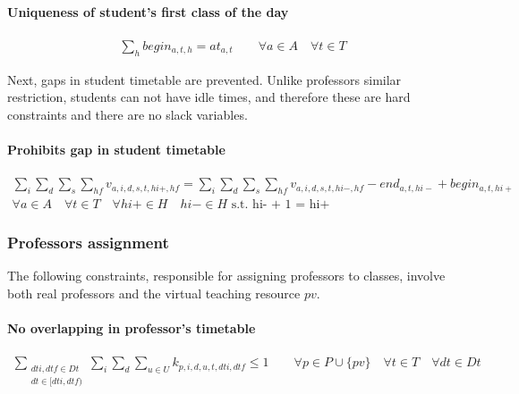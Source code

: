 \paragraph{Uniqueness of student's first class of the day}
\begin{eqnarray}
\sum\limits_{h} begin_{a,t,h} = at_{a,t} \nonumber \qquad
\forall a \in A \quad
\forall t \in T
\end{eqnarray}


Next, gaps in student timetable are prevented. Unlike professors similar restriction, students can not have idle times, and therefore these are hard constraints and there are no slack variables.

\paragraph{Prohibits gap in student timetable}
\begin{eqnarray}
\sum\limits_{i} \sum\limits_{d} \sum\limits_{s} \sum\limits_{hf} v_{a,i,d,s,t,hi+,hf} = 
\sum\limits_{i} \sum\limits_{d} \sum\limits_{s} \sum\limits_{hf} v_{a,i,d,s,t,hi-,hf} - end_{a,t,hi-} + begin_{a,t,hi+} \nonumber \qquad
\\
\forall a \in A \quad
\forall t \in T \quad
\forall hi+ \in H \quad hi- \in H \mbox{ s.t. hi- + 1 = hi+} \nonumber
\end{eqnarray}


\subsubsection{Professors assignment}

The following constraints, responsible for assigning professors to classes, involve both real professors and the virtual teaching resource $pv$.

\paragraph{No overlapping in professor's timetable}
\begin{eqnarray}
\sum_{ \substack {dti,dtf \in Dt \\ dt \in [dti,dtf)} } \sum\limits_{i} \sum\limits_{d} \sum\limits_{u \in U} k_{p,i,d,u,t,dti,dtf} \le 1 \nonumber \qquad
\forall p \in P \cup \{pv\} \quad
\forall t \in T \quad
\forall dt \in Dt
\end{eqnarray}

